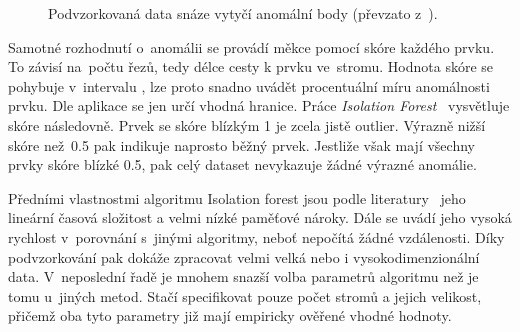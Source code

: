 \begin{figure}[hbt]
    \centering
    \qquad
    \caption{Podvzorkovaná data snáze vytyčí anomální body (převzato z~\cite{isolation-forest}).}
    \label{isolation-forest-subsampling-img}
\end{figure}

Samotné rozhodnutí o~anomálii se provádí měkce pomocí skóre každého prvku. To závisí na~počtu řezů, tedy délce cesty k prvku ve~stromu. Hodnota skóre se pohybuje v~intervalu \(<0,1>\), lze proto snadno uvádět procentuální míru anomálnosti prvku. Dle aplikace se jen určí vhodná hranice. Práce \emph{Isolation Forest}~\cite{isolation-forest} vysvětluje skóre následovně. Prvek se skóre blízkým 1 je zcela jistě outlier. Výrazně nižší skóre než~0.5 pak indikuje naprosto běžný prvek. Jestliže však mají všechny prvky skóre blízké 0.5, pak celý dataset nevykazuje žádné výrazné anomálie.

Předními vlastnostmi algoritmu Isolation forest jsou podle literatury~\cite{isolation-forest} jeho lineární časová složitost a velmi nízké paměťové nároky. Dále se uvádí jeho vysoká rychlost v~porovnání s~jinými algoritmy, neboť nepočítá žádné vzdálenosti. Díky podvzorkování pak dokáže zpracovat velmi velká nebo i vysokodimenzionální data. V~neposlední řadě je mnohem snazší volba parametrů algoritmu než je tomu u~jiných metod. Stačí specifikovat pouze počet stromů a jejich velikost, přičemž oba tyto parametry již mají empiricky ověřené vhodné hodnoty.
